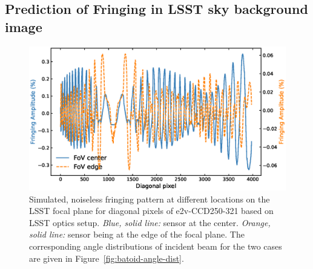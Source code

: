 \documentclass[twocolumn]{aastex63} %
\begin{document}
\begin{CJK*}{UTF8}{gbsn}
\subsection{Prediction of Fringing in LSST sky background image}
\begin{figure}[htb]
\centering
\includegraphics[scale = 0.41]{LSST-fringe-sims.eps}
\caption{Simulated, noiseless fringing pattern at different locations on the LSST focal plane for diagonal pixels of e2v-CCD250-321 based on LSST optics setup. {\it Blue, solid line:} sensor at the center. {\it Orange, solid line:} sensor being at the edge of the focal plane. The corresponding angle distributions of incident beam for the two cases are given in Figure~\ref{fig:batoid-angle-dist}.}
\label{fig:LSST_sims}
\end{figure}



\end{CJK*}
\end{document}
